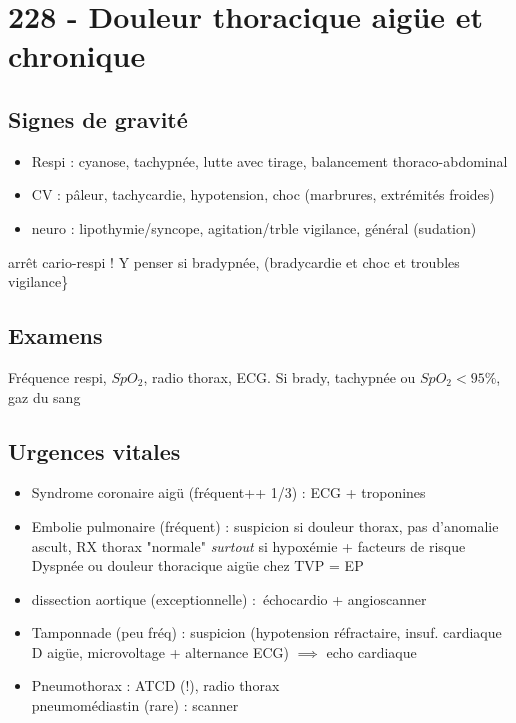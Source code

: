 \section{228 - Douleur thoracique aigüe et chronique}%
\label{sec:228_douleur_thoracique_aigue_et_chronique}

\subsection{Signes de gravité}
\begin{itemize}
\item Respi : cyanose, tachypnée, lutte avec tirage, balancement thoraco-abdominal
\item CV : pâleur, tachycardie, hypotension, choc (marbrures, extrémités
  froides)
\item neuro : lipothymie/syncope, agitation/trble vigilance, général (sudation)
\end{itemize}

\danger arrêt cario-respi ! Y penser si bradypnée, (bradycardie et choc et troubles vigilance\}

\subsection{Examens}
Fréquence respi, $SpO_2$, radio thorax, ECG.
Si {brady, tachy}pnée ou $SpO_2 < 95\%$, gaz du sang

\subsection{Urgences vitales}
\begin{itemize}
\item Syndrome coronaire aigü (fréquent++ 1/3) : ECG + troponines
\item Embolie pulmonaire (fréquent) : suspicion si douleur thorax, pas
  d'anomalie ascult, RX thorax "normale" \textit{surtout}  si hypoxémie +
  facteurs de risque\\
  Dyspnée ou douleur thoracique aigüe chez TVP = EP
\item dissection aortique (exceptionnelle) : échocardio + angioscanner
\item Tamponnade (peu fréq) : suspicion (hypotension réfractaire, insuf.
  cardiaque D aigüe, microvoltage + alternance ECG) $\implies$ echo cardiaque
\item Pneumothorax : ATCD (!), radio thorax \\
  pneumomédiastin (rare) : scanner
\end{itemize}


